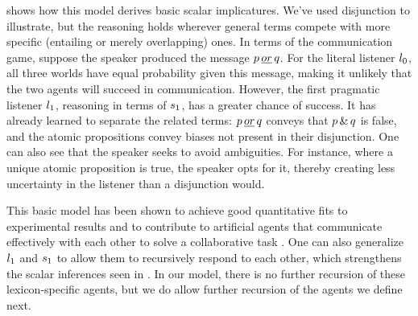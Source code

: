\documentclass[12pt,twoside]{article}
\renewcommand{\_}{\textbf{\textunderscore\hspace{-4pt}\textunderscore\hspace{-3pt}\textunderscore\hspace{-4pt}\textunderscore}\hspace{0.5pt}}			%
\begin{document}
 shows how this model derives basic scalar
implicatures. We've used disjunction to illustrate, but the reasoning
holds wherever general terms compete with more specific (entailing or
merely overlapping) ones. In terms of the communication game, suppose
the speaker produced the message $p\,\emph{or}\,q$. For the literal listener
$l_{0}$, all three worlds have equal probability given this
message, making it unlikely that the two agents will succeed in
communication. However, the first pragmatic listener $l_{1}$,
reasoning in terms of $s_{1}$, has a greater chance of success.
It has already learned to separate the related terms: $p\,\emph{or}\,q$ conveys
that $p\,\&\,q$ is false, and the atomic propositions convey biases not
present in their disjunction. One can also see that the speaker seeks
to avoid ambiguities. For instance, where a unique atomic proposition
is true, the speaker opts for it, thereby creating less uncertainty in
the listener than a disjunction would.

This basic model has been shown to achieve good quantitative fits to
experimental results
\citep{Degen:Franke:2012,Stiller:Goodman:Frank:2011} and to contribute
to artificial agents that communicate effectively with each other to
solve a collaborative task \citep{Vogel-etal:2013}. One can also
generalize $l_{1}$ and $s_{1}$ to allow them to
recursively respond to each other, which strengthens the scalar
inferences seen in . In our model, there is no
further recursion of these lexicon-specific agents, but we do allow
further recursion of the agents we define next.
\end{document}
